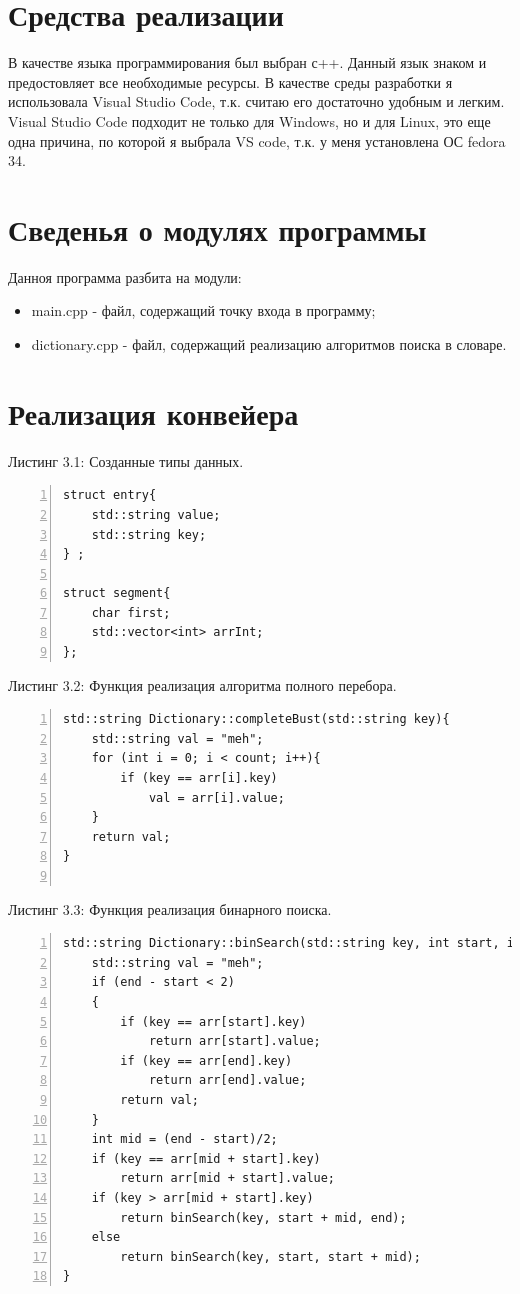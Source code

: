\documentclass[12pt,a4paper]{report}
\begin{document}
\section{Средства реализации}
В качестве языка программирования был выбран с++. Данный язык знаком и предостовляет все необходимые ресурсы.
В качестве среды разработки я использовала Visual Studio Code, т.к. считаю его достаточно удобным и легким.
Visual Studio Code подходит не только для  Windows, но и для Linux, это еще одна причина, по которой я выбрала VS code, т.к. у меня установлена ОС  fedora 34.


\section{Сведенья о модулях программы}

Данноя программа разбита на модули:

\begin{itemize}
	\item main.cpp - файл, содержащий точку входа в программу;
	\item dictionary.cpp - файл, содержащий реализацию алгоритмов поиска в словаре.
\end{itemize}

\section{Реализация конвейера}


\noindent\textrm{Листинг 3.1: Созданные типы данных.}
\begin{lstlisting}[frame=single, numbers=left]
struct entry{
	std::string value;
	std::string key;
} ;

struct segment{
	char first;
	std::vector<int> arrInt;
};
\end{lstlisting}


\noindent\textrm{Листинг 3.2: Функция реализация алгоритма полного перебора.}
\begin{lstlisting}[frame=single, numbers=left]
std::string Dictionary::completeBust(std::string key){
    std::string val = "meh";
    for (int i = 0; i < count; i++){
        if (key == arr[i].key)
            val = arr[i].value;
    }
    return val;
}	
	
\end{lstlisting}

\noindent\textrm{Листинг 3.3: Функция реализация бинарного поиска.}
\begin{lstlisting}[frame=single, numbers=left]
std::string Dictionary::binSearch(std::string key, int start, int end){
    std::string val = "meh";
    if (end - start < 2)
  	{
   	    if (key == arr[start].key)
            return arr[start].value;
        if (key == arr[end].key)
            return arr[end].value;    
        return val;
    }
    int mid = (end - start)/2;
    if (key == arr[mid + start].key)
        return arr[mid + start].value;
    if (key > arr[mid + start].key)
        return binSearch(key, start + mid, end);
    else
        return binSearch(key, start, start + mid);
}
\end{lstlisting}
\end{document}
